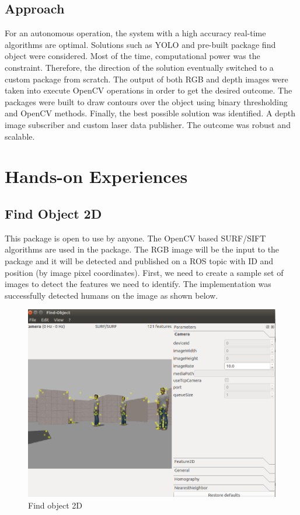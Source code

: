 \documentclass[twoside,12pt,times,onecolumn,a4paper]{report}
\begin{document}
\section{Approach}

For an autonomous operation, the system with a high accuracy real-time algorithms are optimal. Solutions such as YOLO and pre-built package 
find object were considered. Most of the time, computational power was the 
constraint. Therefore, the direction of the solution eventually switched to a custom 
package from scratch. The output of both RGB and depth images were taken into 
execute OpenCV operations in order to get the desired outcome. The packages 
were built to draw contours over the object using binary thresholding and OpenCV 
methods. Finally, the best possible solution was identified. A depth image 
subscriber and custom laser data publisher. The outcome was robust and scalable.

\chapter{Hands-on Experiences}

\section{Find Object 2D}

This package is open to use by anyone. The OpenCV based SURF/SIFT 
algorithms are used in the package. The RGB image will be the input to the package and 
it will be detected and published on a ROS topic with ID and position (by image pixel 
coordinates). First, we need to create a sample set of images to detect the features we 
need to identify. The implementation was successfully detected humans on the image as 
shown below.

\begin{figure}[H]
  \centering
   \includegraphics[width=12cm]{object_detection-fo2d}
  \caption{Find object 2D}
\end{figure}
\end{document}
